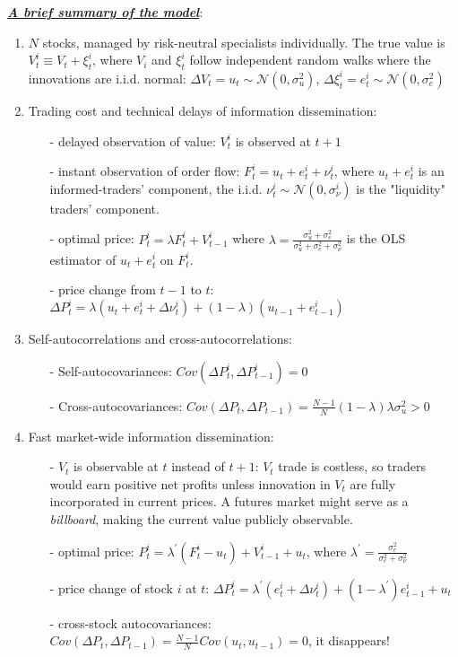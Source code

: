 \noindent \underline{\textbf{\textit{A brief summary of the model}}}:
\begin{enumerate}
    \item $N$ stocks, managed by risk-neutral specialists individually. The true value is $V_t^i\equiv V_t+\xi_t^i$, where $V_i$ and $\xi_t^i$ follow independent random walks where the innovations are i.i.d. 
    normal: $\Delta V_t = u_t \sim \mathcal{N} (0,\sigma_u^2)$, $\Delta \xi_t^i =e_t^i \sim \mathcal{N}(0,\sigma_e^2)$
    \item Trading cost and technical delays of information dissemination:
    \begin{enumerate}
        \item[-] delayed observation of value: $V_t^i$ is observed at $t+1$ 
        \item[-] instant observation of order flow: $F_t^i = u_t+e_t^i+\nu_t^i$, where $u_t+e_t^i$ is an informed-traders' component, the i.i.d. $\nu_t^i \sim \mathcal{N}(0,\sigma_{\nu}^i)$ is the "liquidity" traders' component.
        \item[-] optimal price: $P_t^i=\lambda F_t^i+V_{t-1}^i$ where $\lambda=\frac{\sigma_u^2+\sigma_e^2}{\sigma_u^2+\sigma_e^2+\sigma_{\nu}^2}$ is the OLS estimator of $u_t+e_t^i$ on $F_t^i$.
        \item[-] price change from $t-1$ to $t$: $\Delta P_t^i =\lambda (u_t+e_t^i+\Delta \nu_t^i)+(1-\lambda)(u_{t-1}+e_{t-1}^i)$
    \end{enumerate}
    \item Self-autocorrelations and cross-autocorrelations:
    \begin{enumerate}
        \item[-] Self-autocovariances: $Cov(\Delta P_t^i,\Delta P_{t-1}^i)=0$
        \item[-] Cross-autocovariances: $Cov(\Delta P_t,\Delta P_{t-1})=\frac{N-1}{N}(1-\lambda)\lambda \sigma_u^2 >0$ 
    \end{enumerate}
    \item Fast market-wide information dissemination:
    \begin{enumerate}
        \item[-] $V_t$ is observable at $t$ instead of $t+1$: $V_t$ trade is costless, so traders would earn positive net profits unless innovation in $V_t$ are fully incorporated in current prices. 
        A futures market might serve as a \textit{billboard}, making the current value publicly observable.
        \item[-] optimal price: $P_t^i = \lambda^{\prime}(F_t^i-u_t)+V_{t-1}^i+u_t$, where $\lambda^{\prime}=\frac{\sigma_e^2}{\sigma_e^2+\sigma_{\nu}^2}$
        \item[-] price change of stock $i$ at $t$: $\Delta P_t^i = \lambda^{\prime}(e_t^i+\Delta\nu_t^i)+(1-\lambda^{\prime})e_{t-1}^i+u_t$
        \item[-] cross-stock autocovariances: $Cov(\Delta P_t,\Delta P_{t-1})=\frac{N-1}{N}Cov(u_t,u_{t-1})=0$, it disappears!
    \end{enumerate}
\end{enumerate}  
    
